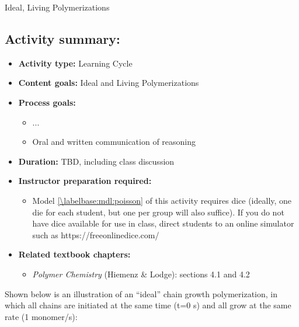 \begin{activity}{Ideal, Living Polymerizations}
\begin{instructornotes}
	\subsection*{Activity summary:}
	\begin{itemize}
		\item \textbf{Activity type:} Learning Cycle
		\item \textbf{Content goals:} Ideal and Living Polymerizations
		\item \textbf{Process goals:} %
			\begin{itemize}
				\item ...
				\item Oral and written communication of reasoning
			\end{itemize}
		\item \textbf{Duration:} TBD, including class discussion
		\item \textbf{Instructor preparation required:}
			\begin{itemize}
				\item Model \ref{\labelbase:mdl:poisson} of this activity requires dice (ideally, one die for each student, but one per group will also suffice).  If you do not have dice available for use in class, direct students to an online simulator such as https://freeonlinedice.com/
			\end{itemize}
		\item \textbf{Related textbook chapters:}
			\begin{itemize}
				\item \emph{Polymer Chemistry} (Hiemenz \& Lodge): sections 4.1 and 4.2
			\end{itemize}
	\end{itemize}
	
\end{instructornotes}


\begin{model}
	\label{\labelbase:mdl:idealliving}

	Shown below is an illustration of an ``ideal'' chain growth polymerization, in which all chains are initiated at the same time (t=0 s) and all grow at the same rate (1 monomer/s):
	    

\end{model}
\end{activity}
